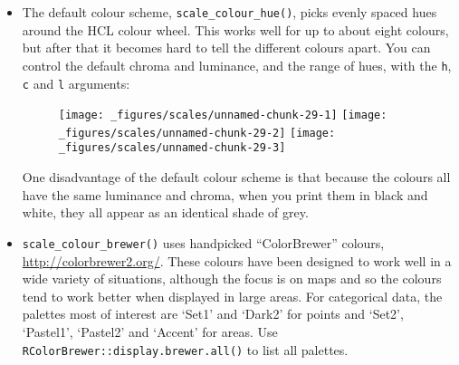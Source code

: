 \begin{itemize}
\item
  The default colour scheme, \texttt{scale\_colour\_hue()}, picks evenly
  spaced hues around the HCL colour wheel. This works well for up to
  about eight colours, but after that it becomes hard to tell the
  different colours apart. You can control the default chroma and
  luminance, and the range of hues, with the \texttt{h}, \texttt{c} and
  \texttt{l} arguments:

\begin{Shaded}
\begin{Highlighting}[]
\StringTok{ }\NormalTok{(} \NormalTok{)}
\StringTok{ }\NormalTok{(} \NormalTok{(}\NormalTok{, }\NormalTok{))}
\end{Highlighting}
\end{Shaded}

  \begin{figure}[H]
    \texttt{[image: \_figures/scales/unnamed-chunk-29-1]}%
    \texttt{[image: \_figures/scales/unnamed-chunk-29-2]}%
    \texttt{[image: \_figures/scales/unnamed-chunk-29-3]}
  \end{figure}

  One disadvantage of the default colour scheme is that because the
  colours all have the same luminance and chroma, when you print them in
  black and white, they all appear as an identical shade of grey.
\item
  \texttt{scale\_colour\_brewer()} uses handpicked ``ColorBrewer''
  colours, \url{http://colorbrewer2.org/}. These colours have been
  designed to work well in a wide variety of situations, although the
  focus is on maps and so the colours tend to work better when displayed
  in large areas. For categorical data, the palettes most of interest
  are `Set1' and `Dark2' for points and `Set2', `Pastel1', `Pastel2' and
  `Accent' for areas. Use \texttt{RColorBrewer::display.brewer.all()} to
  list all palettes. 

\begin{Shaded}
\begin{Highlighting}[]
\StringTok{ }\NormalTok{(} \NormalTok{)}
\StringTok{ }\NormalTok{(} \NormalTok{)}
\StringTok{ }\NormalTok{(} \NormalTok{)}
\end{Highlighting}
\end{Shaded}


\end{itemize}
